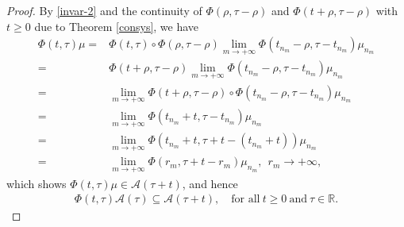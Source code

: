 \documentclass[11pt]{article}
\numberwithin{equation}{section}
\theoremstyle{plain}
\begin{document}
\begin{proof}
 By \eqref{invar-2}
 and the continuity of $\Phi(\rho, \tau-\rho)$ and $\Phi(t+\rho, \tau-\rho)$
 with $t\ge 0$  due to Theorem \ref{consys}, 
 we have
 \begin{align*}
       \Phi(t, \tau) \mu    
      =& \Phi(t, \tau) \circ 
                  \Phi(\rho, \tau-\rho) 
                      \lim_{m \to +\infty} \Phi(t_{n_m} -\rho , \tau - t_{n_m} ) \mu_{n_m}  \nonumber\\
     = & \Phi(t+\rho, \tau-\rho) 
                   \lim_{m \to +\infty} \Phi(t_{n_m} -\rho , \tau - t_{n_m} ) \mu_{n_m}  \nonumber\\       
     = & \lim_{m \to +\infty}
                \Phi(t+\rho, \tau-\rho) 
                     \circ \Phi(t_{n_m} -\rho , \tau - t_{n_m} ) \mu_{n_m} \nonumber\\   
     = & \lim_{m \to +\infty}
                \Phi(t_{n_m} +t, \tau - t_{n_m}) \mu_{n_m}  \nonumber\\                     
     = & \lim_{m \to +\infty}
                \Phi(t_{n_m} +t, \tau +t - (t_{n_m} + t) ) \mu_{n_m}
                \nonumber\\
                = & \lim_{m \to +\infty}
                \Phi(r_m, \tau +t - r_m ) \mu_{n_m},                                                                                                                    
                \ \ r_m \to  +\infty,
 \end{align*}
 which shows $\Phi(t, \tau) \mu \in  \mathcal{A}(\tau+t)$, 
 and hence 
 \begin{align} \label{invar-3}
       \Phi(t, \tau) \mathcal{A}(\tau) \subseteq \mathcal{A}(\tau+t),
             \quad \text{for all} \  t \ge 0 \  \text{and} \  \tau \in \mathbb{R}.
 \end{align}
  

\end{proof}
\end{document}

